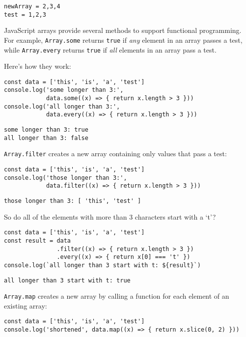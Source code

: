 \begin{verbatim}
newArray = 2,3,4
test = 1,2,3
\end{verbatim}

JavaScript arrays provide several methods to support functional programming.
For example,
\texttt{Array.some} returns \texttt{true} if \emph{any} element in an array passes a test,
while \texttt{Array.every} returns \texttt{true} if \emph{all} elements in an array pass a test.

Here's how they work:

\begin{verbatim}
const data = ['this', 'is', 'a', 'test']
console.log('some longer than 3:',
            data.some((x) => { return x.length > 3 }))
console.log('all longer than 3:',
            data.every((x) => { return x.length > 3 }))
\end{verbatim}

\begin{verbatim}
some longer than 3: true
all longer than 3: false
\end{verbatim}

\texttt{Array.filter} creates a new array containing only values that pass a test:

\begin{verbatim}
const data = ['this', 'is', 'a', 'test']
console.log('those longer than 3:',
            data.filter((x) => { return x.length > 3 }))
\end{verbatim}

\begin{verbatim}
those longer than 3: [ 'this', 'test' ]
\end{verbatim}

So do all of the elements with more than 3 characters start with a `t'?

\begin{verbatim}
const data = ['this', 'is', 'a', 'test']
const result = data
               .filter((x) => { return x.length > 3 })
               .every((x) => { return x[0] === 't' })
console.log(`all longer than 3 start with t: ${result}`)
\end{verbatim}

\begin{verbatim}
all longer than 3 start with t: true
\end{verbatim}

\texttt{Array.map} creates a new array by calling a function for each element of an existing array:

\begin{verbatim}
const data = ['this', 'is', 'a', 'test']
console.log('shortened', data.map((x) => { return x.slice(0, 2) }))
\end{verbatim}

